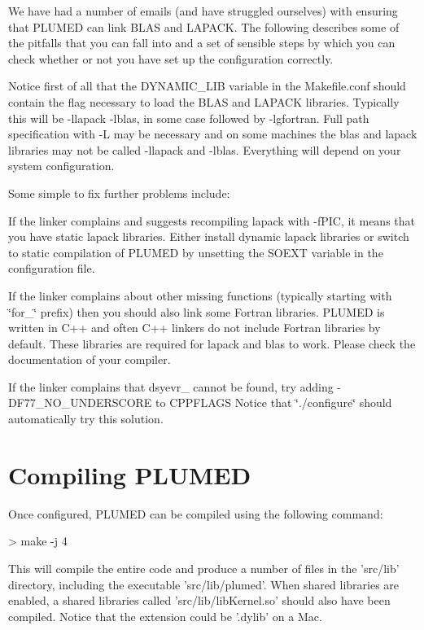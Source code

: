 We have had a number of emails (and have struggled ourselves) with ensuring that P\+L\+U\+M\+E\+D can link B\+L\+A\+S and L\+A\+P\+A\+C\+K. The following describes some of the pitfalls that you can fall into and a set of sensible steps by which you can check whether or not you have set up the configuration correctly.

Notice first of all that the D\+Y\+N\+A\+M\+I\+C\+\_\+\+L\+I\+B variable in the Makefile.\+conf should contain the flag necessary to load the B\+L\+A\+S and L\+A\+P\+A\+C\+K libraries. Typically this will be -\/llapack -\/lblas, in some case followed by -\/lgfortran. Full path specification with -\/\+L may be necessary and on some machines the blas and lapack libraries may not be called -\/llapack and -\/lblas. Everything will depend on your system configuration.

Some simple to fix further problems include\+:
\begin{DoxyItemize}
\item If the linker complains and suggests recompiling lapack with -\/f\+P\+I\+C, it means that you have static lapack libraries. Either install dynamic lapack libraries or switch to static compilation of P\+L\+U\+M\+E\+D by unsetting the S\+O\+E\+X\+T variable in the configuration file.
\item If the linker complains about other missing functions (typically starting with \char`\"{}for\+\_\+\char`\"{} prefix) then you should also link some Fortran libraries. P\+L\+U\+M\+E\+D is written in C++ and often C++ linkers do not include Fortran libraries by default. These libraries are required for lapack and blas to work. Please check the documentation of your compiler.
\item If the linker complains that dsyevr\+\_\+ cannot be found, try adding -\/\+D\+F77\+\_\+\+N\+O\+\_\+\+U\+N\+D\+E\+R\+S\+C\+O\+R\+E to C\+P\+P\+F\+L\+A\+G\+S Notice that \char`\"{}./configure\char`\"{} should automatically try this solution.
\end{DoxyItemize}\hypertarget{_installation_CompilingPlumed}{}\section{Compiling P\+L\+U\+M\+E\+D}\label{_installation_CompilingPlumed}
Once configured, P\+L\+U\+M\+E\+D can be compiled using the following command\+: \begin{DoxyVerb}> make -j 4
\end{DoxyVerb}
 This will compile the entire code and produce a number of files in the 'src/lib' directory, including the executable 'src/lib/plumed'. When shared libraries are enabled, a shared libraries called 'src/lib/lib\+Kernel.\+so' should also have been compiled. Notice that the extension could be '.dylib' on a Mac.

